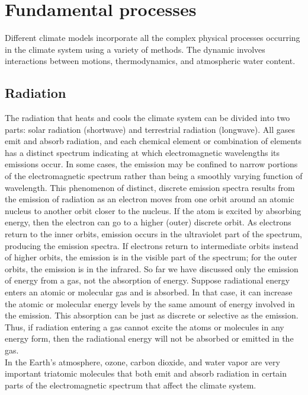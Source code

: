\section{Fundamental processes}
Different climate models incorporate all the complex physical processes occurring in the climate system using a variety of methods. The dynamic involves interactions between motions, thermodynamics, and atmospheric water content.

\subsection{Radiation}
The radiation that heats and cools the climate system can be divided into two parts: solar radiation (shortwave) and terrestrial radiation (longwave).
All gases emit and absorb radiation, and each chemical element or combination of elements has a distinct spectrum indicating at which electromagnetic wavelengths its emissions occur. In some cases, the emission may be confined to narrow portions of the electromagnetic spectrum rather than being a smoothly varying function of wavelength. This phenomenon of distinct, discrete emission spectra results from the emission of radiation as an electron moves from one orbit around an atomic nucleus to another orbit closer to the nucleus. If the atom is excited by absorbing energy, then the electron can go to a higher (outer) discrete orbit.
As electrons return to the inner orbits, emission occurs in the ultraviolet part of the spectrum, producing the emission spectra. If electrons return to intermediate orbits instead of higher orbits, the emission is in the visible part of the spectrum; for the outer orbits, the emission is in the infrared.
So far we have discussed only the emission of energy from a gas, not the absorption of energy. Suppose radiational energy enters an atomic or molecular gas and is absorbed. In that case, it can increase the atomic or molecular energy levels by the same amount of energy involved in the emission. This absorption can be just as discrete or selective as the emission. Thus, if radiation entering a gas cannot excite the atoms or molecules in any energy form, then the radiational energy will not be absorbed or emitted in the gas.\\


In the Earth's atmosphere, ozone, carbon dioxide, and water vapor are very important triatomic molecules that both emit and absorb radiation in certain parts of the electromagnetic spectrum that affect the climate system.


